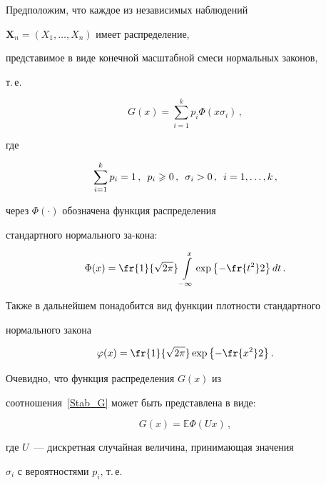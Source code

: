 Предположим, что каждое из независимых наблюдений

$\mathbf{X}_n=(X_1,\ldots , X_n)$ имеет распределение,

представимое в виде конечной масштабной смеси нормальных законов,

т.\,е.\

\begin{equation}

\label{Stab_G} 

G(x)=\sum\limits_{i=1}^k p_i\Phi(x\sigma_i)\,,

\end{equation}

где

\begin{equation*}

\sum\limits_{i=1}^{k}p_i=1\,,\enskip p_i\geqslant0\,,\enskip \sigma_i>0\,,\enskip i=1,\ldots,k\,,

\end{equation*}

через $\Phi(\cdot)$ обозначена функция распределения

стандартного нормального за-\linebreak кона:

$$

\Phi(x)=\fr{1}{\sqrt{2\pi}}\int\limits_{-\infty}^x\exp{\left\{

-\fr{t^2}2\right\}}\,dt\,.

$$



\pagebreak



Также в дальнейшем понадобится вид функции плотности стандартного

нормального закона

$$

\varphi(x)=\fr{1}{\sqrt{2\pi}}\exp{\left\{ -\fr{x^2}2\right\}}\,.

$$



Очевидно, что функция распределения $G(x)$ из

соотношения~\eqref{Stab_G} может быть представлена в виде:

$$

G(x)={\mathbb E}\Phi(U x)\,,

$$

где $U$~--- дискретная случайная величина, принимающая значения

$\sigma_i$ с вероятностями $p_i$, т.\,е.\

